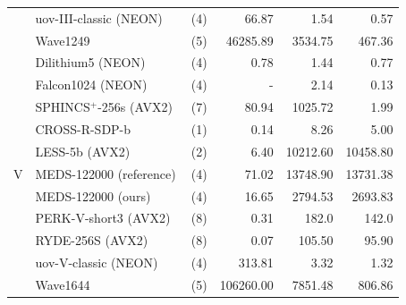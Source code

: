 \documentclass[11pt,a4paper]{report}
\theoremstyle{definition}
\begin{document}
\begin{table}
{\begin{tabular}{p{1.1cm}lrrrr}
                          & uov-III-classic (NEON)~\cite{beullens2023uov}      & (4)          & 66.87           & 1.54          & 0.57            \\
                          & Wave1249~\cite{banegas2023wave}                    & (5)          & 46285.89        & 3534.75       & 467.36          \\
      \midrule
      \multirow{11}{*}{V}
                          & Dilithium5 (NEON)~\cite{becker2021neon}            & (4)          & 0.78            & 1.44          & 0.77            \\
                          & Falcon1024 (NEON)~\cite{nguyen2023fast}            & (4)          & -               & 2.14          & 0.13            \\
                          & SPHINCS$^+$-256s (AVX2)~\cite{aumasson2022sphincs} & (7)          & 80.94           & 1025.72       & 1.99            \\
      \addlinespace[0.2em] \cline{2-6} \addlinespace[0.2em]
                          & CROSS-R-SDP-b~\cite{baldi2024cross}                & (1)          & 0.14            & 8.26          & 5.00            \\
                          & LESS-5b (AVX2)~\cite{baldi2024less}                & (2)          & 6.40            & 10212.60      & 10458.80        \\
                          & MEDS-122000 (reference)                            & (4)          & 71.02           & 13748.90      & 13731.38        \\
                          & MEDS-122000 (ours)                                 & (4)          & 16.65           & 2794.53       & 2693.83         \\
                          & PERK-V-short3 (AVX2)~\cite{aaraj2023perk}          & (8)          & 0.31            & 182.0         & 142.0           \\
                          & RYDE-256S (AVX2)~\cite{aragon2023ryde}             & (8)          & 0.07            & 105.50        & 95.90           \\
                          & uov-V-classic (NEON)~\cite{beullens2023uov}        & (4)          & 313.81          & 3.32          & 1.32            \\
                          & Wave1644~\cite{banegas2023wave}                    & (5)          & 106260.00       & 7851.48       & 806.86          \\
      \bottomrule
    \end{tabular}
  }
  \label{tab:codebasedcomparison}
\end{table}
\end{document}
